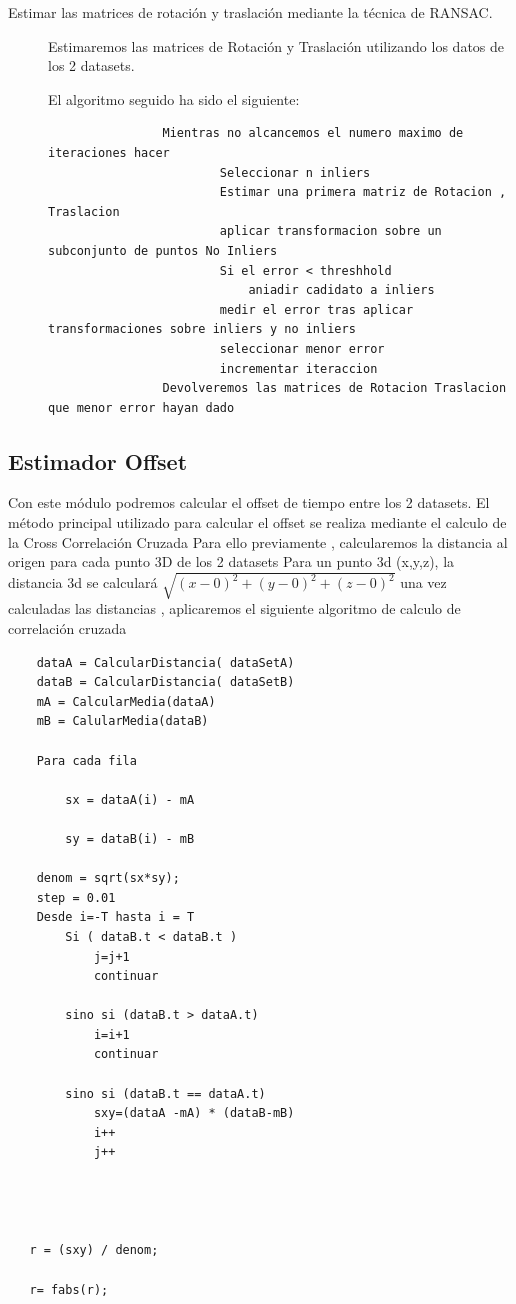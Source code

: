 \begin{description}
	\item[Estimar las matrices de rotación y traslación mediante la técnica de RANSAC.]

		Estimaremos las matrices de Rotación y Traslación utilizando los datos de los 2 datasets.

		El algoritmo seguido ha sido el siguiente:
            \begin{lstlisting}
            	Mientras no alcancemos el numero maximo de iteraciones hacer
            			Seleccionar n inliers
            			Estimar una primera matriz de Rotacion , Traslacion
            			aplicar transformacion sobre un subconjunto de puntos No Inliers
            			Si el error < threshhold
            				aniadir cadidato a inliers
            			medir el error tras aplicar transformaciones sobre inliers y no inliers
            			seleccionar menor error
            			incrementar iteraccion
            	Devolveremos las matrices de Rotacion Traslacion que menor error hayan dado
            \end{lstlisting}
	        

    \end{description}


\subsection{Estimador Offset}

	Con este módulo podremos calcular el offset de tiempo entre los 2 datasets.
	El método principal utilizado para calcular el offset se realiza mediante el calculo de la Cross Correlación Cruzada
	Para ello previamente , calcularemos la distancia al origen para cada punto 3D de los 2 datasets
	Para un punto 3d (x,y,z), la distancia 3d se calculará 
	\begin{math}
	\sqrt{(x-0)^2 +(y-0)^2+(z-0)^2}
	\end{math}
	una vez calculadas las distancias , aplicaremos el siguiente algoritmo de calculo de correlación cruzada
	                                
	\begin{lstlisting}
	dataA = CalcularDistancia( dataSetA)
	dataB = CalcularDistancia( dataSetB)
	mA = CalcularMedia(dataA)
	mB = CalularMedia(dataB)

	Para cada fila

   		sx = dataA(i) - mA

   		sy = dataB(i) - mB

   	denom = sqrt(sx*sy);
   	step = 0.01
   	Desde i=-T hasta i = T
   		Si ( dataB.t < dataB.t )
			j=j+1
    		continuar

    	sino si (dataB.t > dataA.t)
    		i=i+1
    		continuar

    	sino si (dataB.t == dataA.t)
    		sxy=(dataA -mA) * (dataB-mB)
        	i++
        	j++


   

   r = (sxy) / denom;

   r= fabs(r);
    \end{lstlisting}



